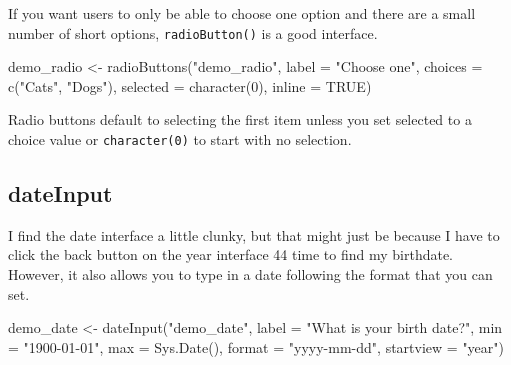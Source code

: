 \documentclass[
  oneside]{book}
\newenvironment{Shaded}{\begin{snugshade}}{\end{snugshade}}
\newcommand{\AttributeTok}[1]{\textcolor[rgb]{0.77,0.63,0.00}{#1}}
\newcommand{\ConstantTok}[1]{\textcolor[rgb]{0.00,0.00,0.00}{#1}}
\newcommand{\DecValTok}[1]{\textcolor[rgb]{0.00,0.00,0.81}{#1}}
\newcommand{\FunctionTok}[1]{\textcolor[rgb]{0.00,0.00,0.00}{#1}}
\newcommand{\NormalTok}[1]{#1}
\newcommand{\OtherTok}[1]{\textcolor[rgb]{0.56,0.35,0.01}{#1}}
\newcommand{\StringTok}[1]{\textcolor[rgb]{0.31,0.60,0.02}{#1}}
\begin{document}
If you want users to only be able to choose one option and there are a small number of short options, \texttt{radioButton}\texttt{()} is a good interface.

\begin{Shaded}
\begin{Highlighting}[]
\NormalTok{demo\_radio }\OtherTok{\textless{}{-}} \FunctionTok{radioButtons}\NormalTok{(}\StringTok{"demo\_radio"}\NormalTok{,}
                           \AttributeTok{label =} \StringTok{"Choose one"}\NormalTok{,}
                           \AttributeTok{choices =} \FunctionTok{c}\NormalTok{(}\StringTok{"Cats"}\NormalTok{, }\StringTok{"Dogs"}\NormalTok{),}
                           \AttributeTok{selected =} \FunctionTok{character}\NormalTok{(}\DecValTok{0}\NormalTok{),}
                           \AttributeTok{inline =} \ConstantTok{TRUE}\NormalTok{)}
\end{Highlighting}
\end{Shaded}

\begin{warning}
Radio buttons default to selecting the first item unless you set \AttributeTok{selected} to a choice value or \texttt{character(0)} to start with no selection.

\end{warning}

\hypertarget{dateinput}{%
\subsection{dateInput}\label{dateinput}}

I find the date interface a little clunky, but that might just be because I have to click the back button on the year interface 44 time to find my birthdate. However, it also allows you to type in a date following the format that you can set.

\begin{Shaded}
\begin{Highlighting}[]
\NormalTok{demo\_date }\OtherTok{\textless{}{-}} \FunctionTok{dateInput}\NormalTok{(}\StringTok{"demo\_date"}\NormalTok{,}
                       \AttributeTok{label =} \StringTok{"What is your birth date?"}\NormalTok{,}
                       \AttributeTok{min =} \StringTok{"1900{-}01{-}01"}\NormalTok{,}
                       \AttributeTok{max =} \FunctionTok{Sys.Date}\NormalTok{(),}
                       \AttributeTok{format =} \StringTok{"yyyy{-}mm{-}dd"}\NormalTok{,}
                       \AttributeTok{startview =} \StringTok{"year"}\NormalTok{)}
\end{Highlighting}
\end{Shaded}
\end{document}
